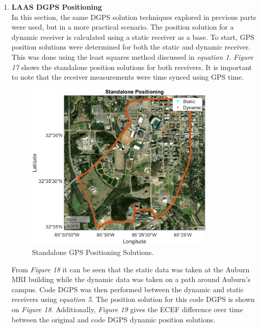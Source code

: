 \documentclass[11pt]{article}
\begin{document}
\begin{enumerate}[label=\textbf{\arabic*.}]
    \item \textbf{LAAS DGPS Positioning} \\
      In this section, the same DGPS solution techniques explored in previous parts were 
      used, but in a more practical scenario. The position solution for a dynamic receiver 
      is calculated using a static receiver as a base. To start, GPS position solutions were 
      determined for both the static and dynamic receiver. This was done using the least 
      squares method discussed in \emph{equation 1}. \emph{Figure 17} shows the standalone 
      position solutions for both receivers. It is important to note that the receiver 
      measurements were time synced using GPS time. 
      \begin{figure}[H]
        \centering
        \includegraphics[width=0.85\textwidth]{p4_a.png}
        \caption{Standalone GPS Positioning Solutions.}
      \end{figure}
      From \emph{Figure 18} it can be seen that the static data was taken at the Auburn MRI 
      building while the dynamic data was taken on a path around Auburn's campus. Code DGPS 
      was then performed between the dynamic and static receivers using \emph{equation 5}. 
      The position solution for this code DGPS is shown on \emph{Figure 18}. Additionally, 
      \emph{Figure 19} gives the ECEF difference over time between the original and code 
      DGPS dynamic position solutions. 
      \begin{figure}[H]
        \centering
        \begin{minipage}[b]{0.49\textwidth}

\end{minipage}
\end{figure}
\end{enumerate}
\end{document}

